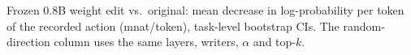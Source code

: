 \begin{table}[h]
\centering\small

\caption{Frozen 0.8B weight edit vs.\ original: mean decrease in log-probability per token of the recorded action (mnat/token), task-level bootstrap CIs. The random-direction column uses the same layers, writers, $\alpha$ and top-$k$.}
\label{tab:mw-offline}
\end{table}
